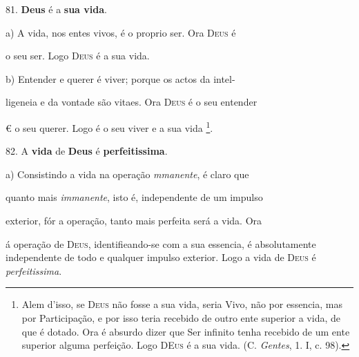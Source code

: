81. \textbf{Deus} é a \textbf{sua vida}.

a) A vida, nos entes vivos, é o proprio ser. Ora \textsc{Deus} é

o seu ser. Logo \textsc{Deus} é a sua vida.

b) Entender e querer é viver; porque os actos da intel-

ligeneia e da vontade são vitaes. Ora \textsc{Deus} é o seu entender

€ o seu querer. Logo é o seu viver e a sua vida \footnote{Alem d'isso, se \textsc{Deus} não fosse a sua vida, seria Vivo, não por essencia, mas por Participação, e por isso teria recebido de outro ente superior a vida, de que é dotado. Ora é absurdo dizer que Ser infinito tenha recebido de um ente superior alguma perfeição. Logo \textsc{DEus} é a sua vida. (C. \emph{Gentes}, 1. I, c. 98).}.

82. A \textbf{vida} de \textbf{Deus} é \textbf{perfeitissima}.

a) Consistindo a vida na operação \emph{mmanente}, é claro que

quanto mais \emph{immanente}, isto é, independente de um impulso

exterior, fór a operação, tanto mais perfeita será a vida. Ora

á operação de \textsc{Deus}, identifieando-se com a sua essencia, é   absolutamente independente de todo e qualquer impulso exterior. Logo a vida de \textsc{Deus} é \emph{perfeitissima}.

